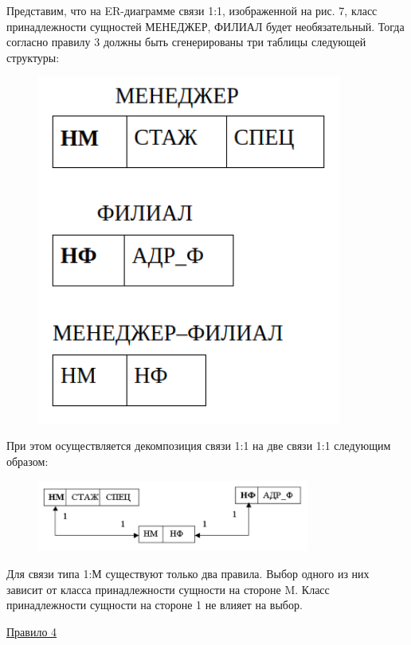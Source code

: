 \begin{enumerate}
    Представим, что на ER-диаграмме связи 1:1, изображенной на рис. 7, класс принадлежности сущностей МЕНЕДЖЕР,
    ФИЛИАЛ будет необязательный. Тогда согласно правилу 3 должны быть сгенерированы три таблицы следующей структуры:

    \begin{figure}[H]
        \centering
        \includegraphics[width=100mm]{assets/security/pic7.png}
        \label{fig:mesh09}
    \end{figure}

    При этом осуществляется декомпозиция связи 1:1 на две связи 1:1 следующим образом:

    \begin{figure}[H]
        \centering
        \includegraphics[width=0.8\textwidth]{assets/security/pic8.png}
        \label{fig:mesh10}
    \end{figure}

    Для связи типа 1:М существуют только два правила. Выбор одного из них зависит от класса принадлежности
    сущности на стороне M. Класс принадлежности сущности на стороне 1 не влияет на выбор.

    \underline{Правило 4}


\end{enumerate}
